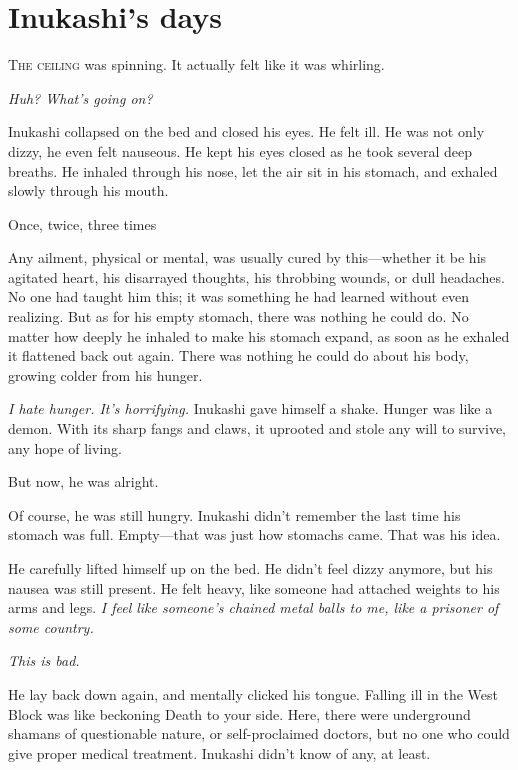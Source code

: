 
\chapter{Inukashi's days}

\lettrine{T}{he ceiling} was spinning. It actually felt like it was whirling.

\emph{Huh? What's going on?}

Inukashi collapsed on the bed and closed his eyes. He felt ill. He was
not only dizzy, he even felt nauseous. He kept his eyes closed as he
took several deep breaths. He inhaled through his nose, let the air sit
in his stomach, and exhaled slowly through his mouth.

Once, twice, three times\el 

Any ailment, physical or mental, was usually cured by this---whether it be
his agitated heart, his disarrayed thoughts, his throbbing wounds, or
dull headaches. No one had taught him this; it was something he had
learned without even realizing. But as for his empty stomach, there was
nothing he could do. No matter how deeply he inhaled to make his stomach
expand, as soon as he exhaled it flattened back out again. There was
nothing he could do about his body, growing colder from his hunger.

\emph{I hate hunger. It's horrifying.} Inukashi gave himself a shake. Hunger
was like a demon. With its sharp fangs and claws, it uprooted and stole
any will to survive, any hope of living.

But now, he was alright.

Of course, he was still hungry. Inukashi didn't remember the last time
his stomach was full. Empty---that was just how stomachs came. That was
his idea.

He carefully lifted himself up on the bed. He didn't feel dizzy anymore,
but his nausea was still present. He felt heavy, like someone had
attached weights to his arms and legs. \emph{I feel like someone's chained
metal balls to me, like a prisoner of some country.}

\emph{This is bad.}

He lay back down again, and mentally clicked his tongue. Falling ill in
the West Block was like beckoning Death to your side. Here, there were
underground shamans of questionable nature, or self-proclaimed doctors,
but no one who could give proper medical treatment. Inukashi didn't know
of any, at least.

